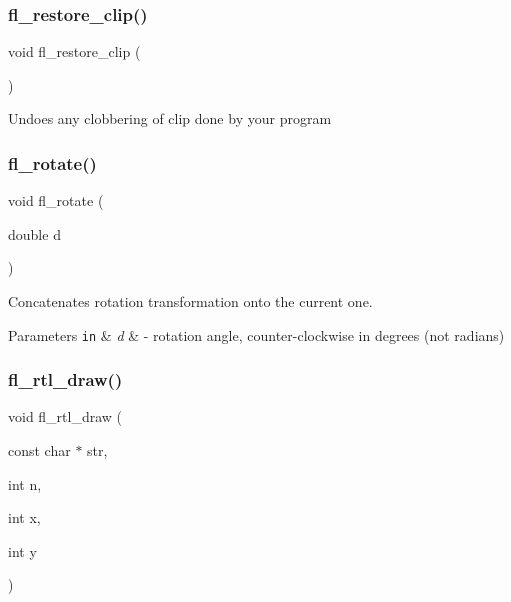 \subsubsection{\texorpdfstring{fl\+\_\+restore\+\_\+clip()}{fl\_restore\_clip()}}
{\footnotesize\ttfamily void fl\+\_\+restore\+\_\+clip (\begin{DoxyParamCaption}{ }\end{DoxyParamCaption})\hspace{0.3cm}{\ttfamily [inline]}}

Undoes any clobbering of clip done by your program \mbox{\label{group__fl__drawings_gab2a13525800bed49c0154562d523717f}} 
\subsubsection{\texorpdfstring{fl\+\_\+rotate()}{fl\_rotate()}}
{\footnotesize\ttfamily void fl\+\_\+rotate (\begin{DoxyParamCaption}\item[{double}]{d }\end{DoxyParamCaption})\hspace{0.3cm}{\ttfamily [inline]}}

Concatenates rotation transformation onto the current one. 
\begin{DoxyParams}[1]{Parameters}
\mbox{\tt in}  & {\em d} & -\/ rotation angle, counter-\/clockwise in degrees (not radians) \\
\hline
\end{DoxyParams}
\mbox{\label{group__fl__drawings_ga4ea048fa98815420272fe661f7c0d993}} 
\subsubsection{\texorpdfstring{fl\+\_\+rtl\+\_\+draw()}{fl\_rtl\_draw()}}
{\footnotesize\ttfamily void fl\+\_\+rtl\+\_\+draw (\begin{DoxyParamCaption}\item[{const char $\ast$}]{str,  }\item[{int}]{n,  }\item[{int}]{x,  }\item[{int}]{y }\end{DoxyParamCaption})\hspace{0.3cm}{\ttfamily [inline]}}

